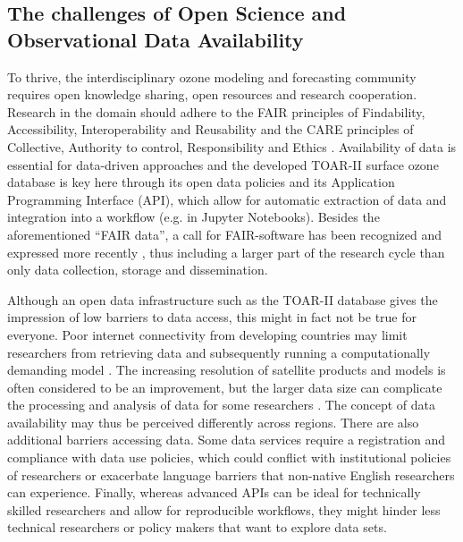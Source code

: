 \documentclass[gmd, manuscript]{copernicus}
\begin{document}
\subsection{The challenges of Open Science and Observational Data Availability}

To thrive, the interdisciplinary ozone modeling and forecasting community requires open knowledge sharing, open resources and research cooperation. Research in the domain should adhere to the FAIR principles of Findability, Accessibility, Interoperability and Reusability \citep{Wilkinson2008} and the CARE principles of Collective, Authority to control, Responsibility and Ethics \citep{Carroll2021}. Availability of data is essential for data-driven approaches and the developed TOAR-II surface ozone database is key here through its open data policies and its Application Programming Interface (API), which allow for automatic extraction of data and integration into a workflow (e.g. in Jupyter Notebooks). Besides the aforementioned “FAIR data”, a call for FAIR-software has been recognized and expressed more recently \citep{Barker2022}, thus including a larger part of the research cycle than only data collection, storage and dissemination.

Although an open data infrastructure such as the TOAR-II database gives the impression of low barriers to data access, this might in fact not be true for everyone. Poor internet connectivity from developing countries may limit researchers from retrieving data and subsequently running a computationally demanding model \citep{Blanken2022, Dwivedi2022}. The increasing resolution of satellite products and models is often considered to be an improvement, but the larger data size can complicate the processing and analysis of data for some researchers \citep{jain_use_2022}. The concept of data availability may thus be perceived differently across regions. There are also additional barriers accessing data. Some data services require a registration and compliance with data use policies, which could conflict with institutional policies of researchers or exacerbate language barriers that non-native English researchers can experience. Finally, whereas advanced APIs can be ideal for technically skilled researchers and allow for reproducible workflows, they might hinder less technical researchers or policy makers that want to explore data sets.
\end{document}
